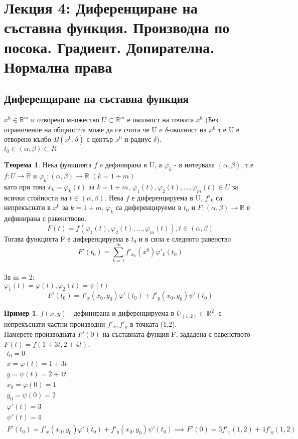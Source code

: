 \documentclass[a4paper,fleqn,12pt]{article}
\theoremstyle{definition}
\newtheorem{theorem}{Tеорема}[subsection]
\newtheorem{example}{Пример}[subsection]
\begin{document}
\newpage

\section{Лекция 4: Диференциране на съставна функция. Производна по посока. Градиент. Допирателна. Нормална права}

\subsection{Диференциране на съставна функция}
$x^0 \in \mathbb{R}^m$ и отворено множество $U \subset \mathbb{R}^m$ е околност на точката $x^0$ (Без ограничение на общността може да се счита че U e $\delta$-околност на $x^0$ т.е U е отворено кълбо $B(x^0;\delta)$ с център $x^0$ и радиус $\delta$). \\
$t_0 \in (\alpha, \beta) \subset R$

\begin{theorem}
Нека функцията $f$ e дефинирана в U, а $\varphi_k$ - в интервала $(\alpha, \beta)$, т.е \\
$f: U \to \mathbb{R}$ и $\varphi_k: (\alpha, \beta)  \to \mathbb{R} $ $ (k = 1 \div m)$\\
като при това $x_k = \varphi_k(t)$ за $ k = 1 \div m $, $ \varphi_1(t),  \varphi_2(t), ...,  \varphi_m(t) \in U$ за всички стойности на $t \in (\alpha, \beta)$. Нека $f$ е диференцируема в U, $f'_k$ са непрекъснати в $x^0$ за $ k = 1 \div m$, $\varphi_k$ са диференцируеми в $t_0$ и $F: (\alpha, \beta)  \to \mathbb{R}$ е дефинирана с равенствово. \\
$$F(t) = f(\varphi_1(t),  \varphi_2(t), ...,  \varphi_m(t)), t \in (\alpha, \beta)$$
Тогава функцията F е диференцируема в $t_0$ и в сила е следното равенство
$$F'(t_0) = \sum_{k =1}^m f'_{x_k}(x^0)\varphi '_k (t_0)$$ \\
За m = 2: \\
$\varphi_1(t) = \varphi(t) , \varphi_2(t) =\psi(t) $
$$F'(t_0) = f'_x(x_0, y_0)\varphi'(t_0) + f'_y(x_0, y_0)\psi'(t_0)$$
\end{theorem}

\begin{example}
$f(x,y)$ - дефинирана и диференцируема в $U_{(1,2)} \subset \mathbb{R}^2$. с непрекъснати частни производни $f'_x, f'_y$ в точката (1,2). \\
Намерете производната $F'(0)$ на съставната фунция F, зададена с равенството $F(t) = f(1+3t, 2+4t)$.
\begin{gather*}
t_0 = 0 \\
x = \varphi(t) = 1+3t \\
y = \psi(t) = 2 + 4t \\
x_0 = \varphi(0) = 1 \\
y_0 = \psi(0) = 2 \\
\varphi'(t) = 3 \\
\psi'(t) = 4 \\
F'(t_0) = f'_x(x_0, y_0)\varphi'(t_0) + f'_y(x_0, y_0)\psi'(t_0) \implies  F'(0) = 3f'_x(1,2) + 4f'_y(1,2)
\end{gather*}
\end{example}
\end{document}
